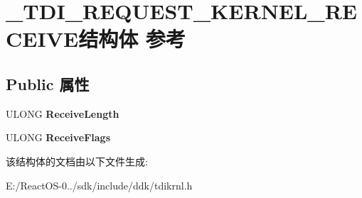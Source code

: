 \hypertarget{struct___t_d_i___r_e_q_u_e_s_t___k_e_r_n_e_l___r_e_c_e_i_v_e}{}\section{\+\_\+\+T\+D\+I\+\_\+\+R\+E\+Q\+U\+E\+S\+T\+\_\+\+K\+E\+R\+N\+E\+L\+\_\+\+R\+E\+C\+E\+I\+V\+E结构体 参考}
\label{struct___t_d_i___r_e_q_u_e_s_t___k_e_r_n_e_l___r_e_c_e_i_v_e}
\subsection*{Public 属性}
\begin{DoxyCompactItemize}
\item 
\mbox{\label{struct___t_d_i___r_e_q_u_e_s_t___k_e_r_n_e_l___r_e_c_e_i_v_e_a3ca86f81648f9bbed09994d491d37291}} 
U\+L\+O\+NG {\bfseries Receive\+Length}
\item 
\mbox{\label{struct___t_d_i___r_e_q_u_e_s_t___k_e_r_n_e_l___r_e_c_e_i_v_e_a9ee500a32b777f75d14ae2c21cd63ed8}} 
U\+L\+O\+NG {\bfseries Receive\+Flags}
\end{DoxyCompactItemize}


该结构体的文档由以下文件生成\+:\begin{DoxyCompactItemize}
\item 
E\+:/\+React\+O\+S-\/0../sdk/include/ddk/tdikrnl.\+h\end{DoxyCompactItemize}
